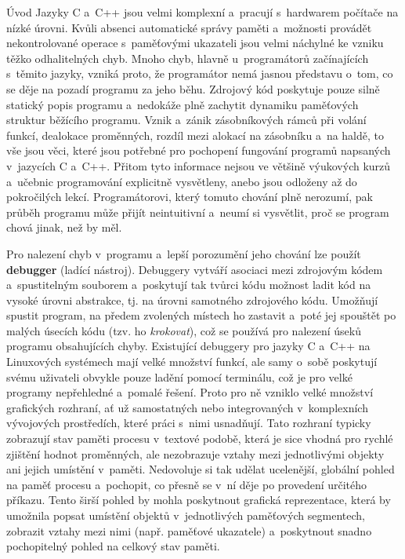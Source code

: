 \documentclass[czech,bachelor,male,python,dept460,hidelinks]{diploma}						%
\newcommand{\parspace}[1][]{
	\ifthenelse{\isempty{#1}}{\vspace{0mm}}{\vspace{#1}}
	\par
}
\begin{document}
\MakeTitlePages

\begin{section}{Úvod}
	Jazyky C a~C++ jsou velmi komplexní a~pracují s~hardwarem počítače na nízké úrovni.
	Kvůli absenci automatické správy paměti a~možnosti provádět nekontrolované operace s~paměťovými ukazateli jsou velmi náchylné ke vzniku těžko odhalitelných chyb.
	Mnoho chyb, hlavně u~programátorů začínajících s~těmito jazyky, vzniká proto, že programátor nemá jasnou představu o~tom, co se děje na pozadí programu za
	jeho běhu. Zdrojový kód poskytuje pouze silně statický popis programu a~nedokáže plně zachytit dynamiku paměťových struktur běžícího programu.
	Vznik a~zánik zásobníkových rámců při volání funkcí, dealokace proměnných, rozdíl mezi alokací na zásobníku a~na haldě,
	to vše jsou věci, které jsou potřebné pro pochopení fungování programů napsaných v~jazycích C a~C++. Přitom tyto informace nejsou ve většině výukových kurzů
	a~učebnic programování explicitně vysvětleny, anebo jsou odloženy až do pokročilých lekcí. Programátorovi, který tomuto chování plně nerozumí,
	pak průběh programu může přijít neintuitivní a~neumí si vysvětlit, proč se program chová jinak, než by měl.
	
	\parspace Pro nalezení chyb v~programu a~lepší porozumění jeho chování lze použít \textbf{debugger} (ladící nástroj).
	Debuggery vytváří asociaci mezi zdrojovým kódem a~spustitelným souborem a~poskytují tak tvůrci kódu možnost ladit kód
	na vysoké úrovni abstrakce, tj. na úrovni samotného zdrojového kódu. Umožňují spustit program, na předem zvolených místech ho zastavit a~poté jej spouštět
	po malých úsecích kódu (tzv. ho \textit{krokovat}), což se používá pro nalezení úseků programu obsahujících chyby. Existující debuggery pro jazyky C a~C++ na
	Linuxových systémech mají velké množství funkcí, ale samy o~sobě poskytují svému uživateli obvykle pouze ladění pomocí terminálu, což je pro velké programy
	nepřehledné a~pomalé řešení. Proto pro ně vzniklo velké množství grafických rozhraní, ať už samostatných nebo integrovaných v~komplexních vývojových prostředích,
	které práci s~nimi usnadňují. Tato rozhraní typicky zobrazují stav paměti procesu v~textové podobě, která je sice vhodná pro rychlé
	zjištění hodnot proměnných, ale nezobrazuje vztahy mezi jednotlivými objekty ani jejich umístění v~paměti.
	Nedovoluje si tak udělat ucelenější, globální pohled na paměť procesu a~pochopit, co přesně se v~ní děje po provedení určitého příkazu.
	Tento širší pohled by mohla poskytnout grafická reprezentace, která by umožnila popsat umístění objektů v~jednotlivých paměťových segmentech,
	zobrazit vztahy mezi nimi (např. paměťové ukazatele) a~poskytnout snadno pochopitelný pohled na celkový stav paměti.
	

\end{section}
\end{document}
